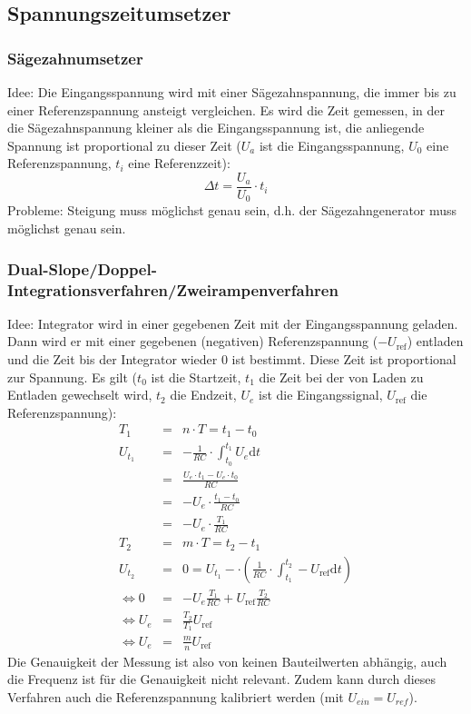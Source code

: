 \subsection{Spannungszeitumsetzer}
\subsubsection{Sägezahnumsetzer}
Idee: Die Eingangsspannung wird mit einer Sägezahnspannung, die immer bis zu einer Referenzspannung ansteigt vergleichen. Es wird die Zeit gemessen, in der die
Sägezahnspannung kleiner als die Eingangsspannung ist, die anliegende Spannung ist proportional zu dieser Zeit
($U_a$ ist die Eingangsspannung, $U_0$ eine Referenzspannung, $t_i$ eine Referenzzeit):
\begin{equation*}
    \Delta t = \frac{U_a}{U_0} \cdot t_i
\end{equation*}
Probleme: Steigung muss möglichst genau sein, d.h. der Sägezahngenerator muss möglichst genau sein.

\subsubsection{Dual-Slope/Doppel-Integrationsverfahren/Zweirampenverfahren}
Idee: Integrator wird in einer gegebenen Zeit mit der Eingangsspannung geladen. 
Dann wird er mit einer gegebenen (negativen) Referenzspannung ($-U_\text{ref}$) entladen und die Zeit bis der Integrator wieder $0$ ist bestimmt.
Diese Zeit ist proportional zur Spannung. Es gilt ($t_0$ ist die Startzeit, $t_1$ die Zeit bei der von Laden zu Entladen gewechselt wird, $t_2$ die Endzeit,
$U_e$ ist die Eingangssignal, $U_\text{ref}$ die Referenzspannung):
\begin{eqnarray*}
    T_1 &=& n \cdot T = t_1 - t_0 \\
    U_{t_1} &=& - \frac{1}{RC} \cdot \int_{t_0}^{t_1} U_e \text{d}t \\
    &=& \frac{U_e \cdot t_1 - U_e \cdot t_0}{RC} \\
    &=& -U_e \cdot \frac{t_1 - t_0}{RC} \\
    &=& -U_e \cdot \frac{T_1}{RC}\\
    T_2 &=& m \cdot T = t_2 - t_1 \\
    U_{t_2} &=& 0 = U_{t_1} - \cdot \left( \frac{1}{RC} \cdot \int_{t_1}^{t_2} - U_\text{ref} \text{d}t \right)\\
    \Leftrightarrow 0 &=& -U_e \frac{T_1}{RC} + U_ \text{ref} \frac{T_2}{RC} \\
    \Leftrightarrow U_e &=& \frac{T_2}{T_1} U_\text{ref} \\
    \Leftrightarrow U_e &=& \frac{m}{n} U_\text{ref}
\end{eqnarray*}
Die Genauigkeit der Messung ist also von keinen Bauteilwerten abhängig, auch die Frequenz ist für die Genauigkeit nicht relevant. 
Zudem kann durch dieses Verfahren auch die Referenzspannung kalibriert werden (mit $U_{ein} = U_{ref}$).

